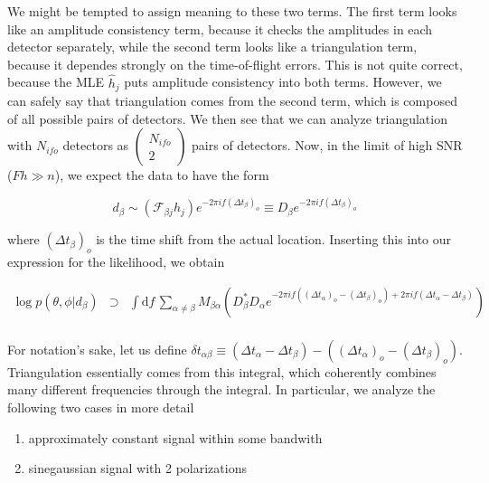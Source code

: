\documentclass[10pt]{article}
\begin{document}
We might be tempted to assign meaning to these two terms. The first term looks like an amplitude consistency term, because it checks the amplitudes in each detector separately, while the second term looks like a triangulation term, because it dependes strongly on the time-of-flight errors. This is not quite correct, because the MLE $\hat{h}_j$ puts amplitude consistency into both terms. However, we can safely say that triangulation comes from the second term, which is composed of all possible pairs of detectors. We then see that we can analyze triangulation with $N_{ifo}$ detectors as $\left(\begin{matrix}N_{ifo}\\2\end{matrix}\right)$ pairs of detectors. Now, in the limit of high SNR ($Fh \gg n$), we expect the data to have the form

\begin{equation}
d_\beta \sim \left( \mathcal{F}_{\beta j} h_j \right) e^{-2\pi i f \left(\Delta t_\beta\right)_o} \equiv D_\beta e^{-2\pi i f \left(\Delta t_\beta\right)_o}
\end{equation}

where $\left(\Delta t_\beta\right)_o$ is the time shift from the actual location. Inserting this into our expression for the likelihood, we obtain

\begin{eqnarray}
\log p(\theta,\phi|d_\beta) & \supset & \int\mathrm{d}f\,\sum\limits_{\alpha\neq\beta} M_{\beta\alpha} \left(D_\beta^\ast D_\alpha e^{-2\pi i f\left(\left(\Delta t_\alpha\right)_o-\left(\Delta t_\beta\right)_o\right) +2\pi i f (\Delta t_\alpha - \Delta t_\beta)}\right) \\ 
\end{eqnarray}

For notation's sake, let us define $\delta t_{\alpha\beta} \equiv \left(\Delta t_\alpha - \Delta t_\beta\right) - \left(\left(\Delta t_\alpha\right)_o-\left(\Delta t_\beta\right)_o\right)$. Triangulation essentially comes from this integral, which coherently combines many different frequencies through the integral. In particular, we analyze the following two cases in more detail

\begin{enumerate}
	\item{approximately constant signal within some bandwith}
	\item{sinegaussian signal with 2 polarizations}
\end{enumerate}
\end{document}
